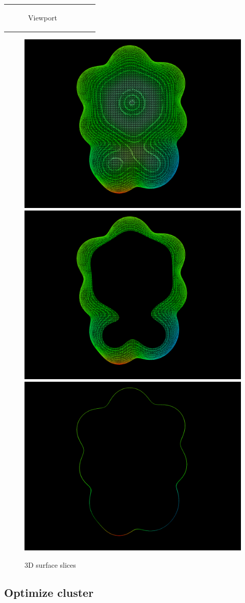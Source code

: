 \documentclass[10pt]{article}
\begin{document}
\begin{tabular}{lcr}
\begin{minipage}{.45\linewidth}
\begin{figure}[H]
\begin{center}
        \end{center}
        \caption{Viewport\label{fig:4_9_1}}
    \end{figure}
\end{minipage}
\end{tabular}

\vspace*{5mm}

\begin{figure}[H]
    \begin{center}
        \includegraphics[width=0.3\linewidth]{Clipping_plane_1.png}
        \hspace*{5mm}
        \includegraphics[width=0.3\linewidth]{Clipping_plane_2.png}
        \hspace*{5mm}
        \includegraphics[width=0.3\linewidth]{Clipping_plane_3.png}
    \end{center}
    \caption{3D surface slices \label{fig:4_9_2}}
\end{figure}

\vspace*{5mm}

\subsection{Optimize cluster \label{sec:4.10}}
\end{document}
